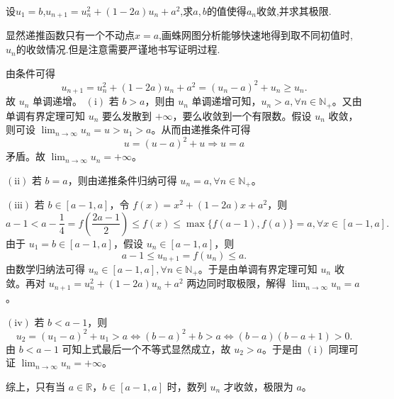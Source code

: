 \documentclass[../../main.tex]{subfiles}
\begin{document}
\begin{example}
设\(u_1 = b\),\(u_{n + 1}=u_{n}^{2}+(1 - 2a)u_{n}+a^{2}\),求$a,b$的值使得$a_n$收敛,并求其极限.
\end{example}
\begin{note}
显然递推函数只有一个不动点$x=a$,画蛛网图分析能够快速地得到取不同初值时,$u_n$的收敛情况.但是注意需要严谨地书写证明过程.
\end{note}
\begin{solution}
由条件可得
\[
u_{n + 1}=u_{n}^{2}+(1 - 2a)u_n + a^2=(u_n - a)^2 + u_n\geqslant u_n.
\]
故 \(u_n\) 单调递增。 
\((\mathrm{i})\) 若 \(b > a\)，则由 \(u_n\) 单调递增可知，\(u_n > a,\forall n\in \mathbb{N}_+\)。又由单调有界定理可知 \(u_n\) 要么发散到 \(+\infty\)，要么收敛到一个有限数。假设 \(u_n\) 收敛，则可设 \(\lim_{n\rightarrow \infty}u_n = u > u_1 > a\)。从而由递推条件可得
\[
u=(u - a)^2 + u\Rightarrow u = a
\]
矛盾。故 \(\lim_{n\rightarrow \infty}u_n = +\infty\)。

\((\mathrm{ii})\) 若 \(b = a\)，则由递推条件归纳可得 \(u_n = a,\forall n\in \mathbb{N}_+\)。

\((\mathrm{iii})\) 若 \(b\in [a - 1,a]\)，令 \(f(x)=x^2+(1 - 2a)x + a^2\)，则
\[
a - 1 < a - \frac{1}{4}=f\left(\frac{2a - 1}{2}\right)\leqslant f(x)\leqslant \max\{f(a - 1),f(a)\}=a,\forall x\in [a - 1,a].
\]
由于 \(u_1 = b\in [a - 1,a]\)，假设 \(u_n\in [a - 1,a]\)，则
\[
a - 1\leqslant u_{n + 1}=f(u_n)\leqslant a.
\]
由数学归纳法可得 \(u_n\in [a - 1,a],\forall n\in \mathbb{N}_+\)。于是由单调有界定理可知 \(u_n\) 收敛。再对 \(u_{n + 1}=u_{n}^{2}+(1 - 2a)u_n + a^2\) 两边同时取极限，解得 \(\lim_{n\rightarrow \infty}u_n = a\)。

\((\mathrm{iv})\) 若 \(b < a - 1\)，则
\[
u_2=(u_1 - a)^2 + u_1 > a\Leftrightarrow (b - a)^2 + b > a\Leftrightarrow (b - a)(b - a + 1) > 0.
\]
由 \(b < a - 1\) 可知上式最后一个不等式显然成立，故 \(u_2 > a\)。于是由 \((\mathrm{i})\) 同理可证 \(\lim_{n\rightarrow \infty}u_n = +\infty\)。

综上，只有当 \(a\in \mathbb{R}\)，\(b\in [a - 1,a]\) 时，数列 \(u_n\) 才收敛，极限为 \(a\)。
\end{solution}
\end{document}
